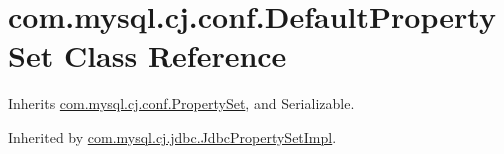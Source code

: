 \hypertarget{classcom_1_1mysql_1_1cj_1_1conf_1_1_default_property_set}{}\section{com.\+mysql.\+cj.\+conf.\+Default\+Property\+Set Class Reference}
\label{classcom_1_1mysql_1_1cj_1_1conf_1_1_default_property_set}


Inherits \mbox{\hyperlink{interfacecom_1_1mysql_1_1cj_1_1conf_1_1_property_set}{com.\+mysql.\+cj.\+conf.\+Property\+Set}}, and Serializable.



Inherited by \mbox{\hyperlink{classcom_1_1mysql_1_1cj_1_1jdbc_1_1_jdbc_property_set_impl}{com.\+mysql.\+cj.\+jdbc.\+Jdbc\+Property\+Set\+Impl}}.

